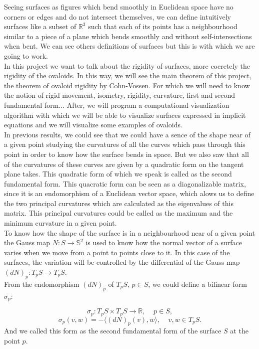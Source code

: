 Seeing surfaces as figures which bend smoothly in Euclidean space have no corners or edges and do not intersect themselves, we can define intuitively surfaces like a subset of $\mathbb{R}^3$ such that each of its points has a neighbourhood similar to a piece of a plane which bends smoothly and without self-intersections when bent. We can see others definitions of surfaces but this is with which we are going to work.
${ }$\\

In this project we want to talk about the rigidity of surfaces, more cocretely the rigidity of the ovaloids. In this way, we will see the main theorem of this project, the theorem of ovaloid rigidity by Cohn-Vossen. For which we will need to know the notion of rigid movement, isometry, rigidity, curvature, first and second fundamental form... After, we will program a computational visualization algorithm with which we will be able to visualize surfaces expressed in implicit equations and we will visualize some examples of ovaloids.
${ }$\\

In previous results, we could see that we could have a sence of the shape near of a given point  studying the curvatures of all the curves which pass through this point in order to know how the surface bends in space. But we also saw that all of the curvatures of these curves are given by a quadratic form on the tangent plane takes. This quadratic form of which we speak is called as the second fundamental form. This quacratic form can be seen as a diagonalizable matrix, since it is an endomorphism of a Euclidean vector space, which alows us to define the two principal curvatures which are calculated as the eigenvalues of this matrix. This principal curvatures could be called as the maximum and the minimum curvature in a given point.
${ }$\\

To know how the shape of the surface is in a neighbourhood near of a given point the Gauss map $N : S \to \mathbb{S}^2$ is used to know how the normal vector of a surface varies when we move from a point to points close to it. In this case of the surfaces, the variation will be controlled by the differential of the Gauss map $(dN)_p : T_p S \to T_p S$.
${ }$\\

From the endomorphism $(dN)_p$ of $T_pS$, $p \in S$, we could define a bilinear form $\sigma_p$:

$$ \sigma_p : T_pS \times T_pS \to \mathbb{R}, \;\;\;\; p \in S, $$
$$ \sigma_p(v,w) = - \langle (dN)_p(v), w \rangle, \;\;\;\; v,w \in T_pS. $$
And we called this form as the second fundamental form of the surface $S$ at the point $p$.
${ }$\\

